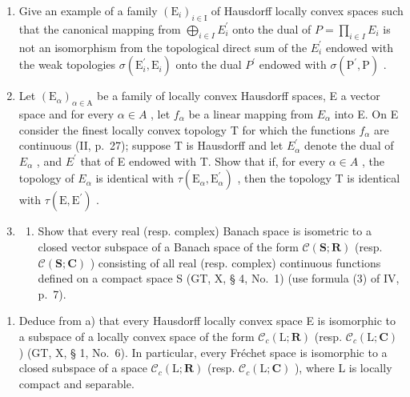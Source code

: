 \begin{enumerate}
\def\labelenumi{\arabic{enumi})}
\setcounter{enumi}{22}
\item
  Give an example of a family \((\mathrm{E}_{i})_{i\in\mathrm{I}}\) of Hausdorff locally convex spaces such that the canonical mapping from \(\bigoplus_{i\in I} E_{i}^{\prime}\) onto the dual of \(P = \prod_{i\in I} E_{i}\) is not an isomorphism from the topological direct sum of the \(E_{i}^{\prime}\) endowed with the weak topologies \(\sigma(\mathrm{E}_{i}^{\prime}, \mathrm{E}_{i})\) onto the dual \(P^{\prime}\) endowed with \(\sigma(\mathrm{P}^{\prime}, \mathrm{P})\) .
\item
  Let \((\mathrm{E}_{\alpha})_{\alpha\in\mathrm{A}}\) be a family of locally convex Hausdorff spaces, E a vector space and for every \(\alpha\in A\) , let \(f_{\alpha}\) be a linear mapping from \(E_{\alpha}\) into E. On E consider the finest locally convex topology T for which the functions \(f_{\alpha}\) are continuous (II, p.~27); suppose T is Hausdorff and let \(E_{\alpha}^{\prime}\) denote the dual of \(E_{\alpha}\) , and \(E^{\prime}\) that of E endowed with T. Show that if, for every \(\alpha\in A\) , the topology of \(E_{\alpha}\) is identical with \(\tau(\mathrm{E}_{\alpha},\mathrm{E}_{\alpha}^{\prime})\) , then the topology T is identical with \(\tau(\mathrm{E},\mathrm{E}^{\prime})\) .
\item
  \begin{enumerate}
  \def\labelenumii{\alph{enumii})}
  \tightlist
  \item
    Show that every real (resp. complex) Banach space is isometric to a closed vector subspace of a Banach space of the form \(\mathcal{C}(\mathbf{S};\mathbf{R})\) (resp. \(\mathcal{C}(\mathbf{S};\mathbf{C})\) ) consisting of all real (resp. complex) continuous functions defined on a compact space S (GT, X, § 4, No.~1) (use formula (3) of IV, p.~7).
  \end{enumerate}
\end{enumerate}

\begin{enumerate}
\def\labelenumi{\alph{enumi})}
\setcounter{enumi}{1}
\tightlist
\item
  Deduce from a) that every Hausdorff locally convex space E is isomorphic to a subspace of a locally convex space of the form \(\mathcal{C}_{c}(\mathrm{L};\mathbf{R})\) (resp. \(\mathcal{C}_{c}(\mathrm{L};\mathbf{C})\) ) (GT, X, § 1, No.~6). In particular, every Fréchet space is isomorphic to a closed subspace of a space \(\mathcal{C}_{c}(\mathrm{L};\mathbf{R})\) (resp. \(\mathcal{C}_{c}(\mathrm{L};\mathbf{C})\) ), where L is locally compact and separable.
\end{enumerate}
